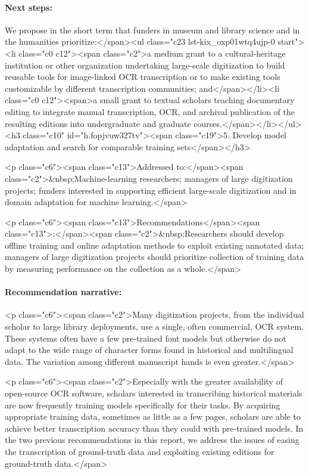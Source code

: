 \documentclass[twoside,11pt]{report}
\begin{document}
\paragraph{Next steps:} We propose in the short term that funders in museum and library science and in the humanities prioritize:</span><ul class="c23 lst-kix_oxp01wtq4ujp-0 start"><li class="c0 c12"><span class="c2">a medium grant to a cultural-heritage institution or other organization undertaking large-scale digitization to build reusable tools for image-linked OCR transcription or to make existing tools customizable by different transcription communities; and</span></li><li class="c0 c12"><span>a small grant to textual scholars teaching documentary editing to integrate manual transcription, OCR, and archival publication of the resulting editions into undergraduate and graduate courses.</span></li></ul><h3 class="c10" id="h.fopjvuw327tv"><span class="c19">5. Develop model adaptation and search for comparable training sets</span></h3>

<p class="c6"><span class="c13">Addressed to:</span><span class="c2">&nbsp;Machine-learning researchers; managers of large digitization projects; funders interested in supporting efficient large-scale digitization and in domain adaptation for machine learning.</span>

<p class="c6"><span class="c13">Recommendations</span><span class="c13">:</span><span class="c2">&nbsp;Researchers should develop offline training and online adaptation methods to exploit existing annotated data; managers of large digitization projects should prioritize collection of training data by measuring performance on the collection as a whole.</span>

\paragraph{Recommendation narrative:}

<p class="c6"><span class="c2">Many digitization projects, from the individual scholar to large library deployments, use a single, often commercial, OCR system. These systems often have a few pre-trained font models but otherwise do not adapt to the wide range of character forms found in historical and multilingual data. The variation among different manuscript hands is even greater.</span>

<p class="c6"><span class="c2">Especially with the greater availability of open-source OCR software, scholars interested in transcribing historical materials are now frequently training models specifically for their tasks. By acquiring appropriate training data, sometimes as little as a few pages, scholars are able to achieve better transcription accuracy than they could with pre-trained models. In the two previous recommendations in this report, we address the issues of easing the transcription of ground-truth data and exploiting existing editions for ground-truth data.</span>
\end{document}
